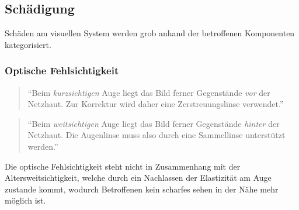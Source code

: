 \subsection{Schädigung}
Schäden am visuellen System werden grob anhand der betroffenen Komponenten kategorisiert.

\subsubsection{Optische Fehlsichtigkeit}
\begin{quote}
\enquote{Beim \textit{kurzsichtigen} Auge liegt das Bild ferner Gegenstände \textit{vor} der Netzhaut. Zur Korrektur wird daher eine Zerstreuungslinse verwendet.} \cite[S. 236]{physik1}
\end{quote}

\begin{quote}
\enquote{Beim \textit{weitsichtigen} Auge liegt das Bild ferner Gegenstände \textit{hinter} der Netzhaut. Die Augenlinse muss also durch eine Sammellinse unterstützt werden.} \cite[S. 237]{physik1}
\end{quote}

Die optische Fehlsichtigkeit steht nicht in Zusammenhang mit der Altersweitsichtigkeit, welche durch ein Nachlassen der Elastizität am Auge zustande kommt, wodurch Betroffenen kein scharfes sehen in der Nähe mehr möglich ist.
